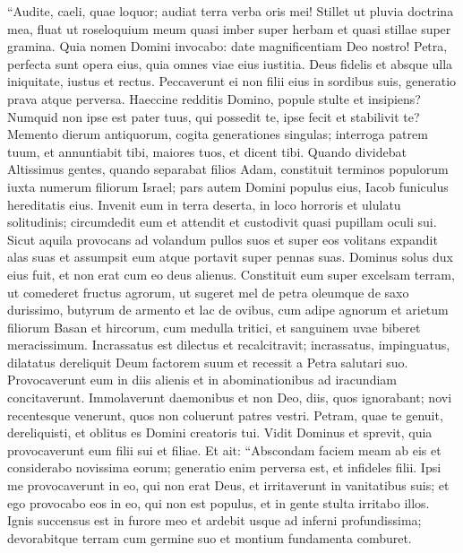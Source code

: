 \begin{biblechapter} 
\verse “Audite, caeli, quae loquor; audiat terra verba oris mei! 
\verse Stillet ut pluvia doctrina mea, fluat ut roseloquium meum quasi imber super herbam et quasi stillae super gramina. 
\verse Quia nomen Domini invocabo: date magnificentiam Deo nostro! 
\verse Petra, perfecta sunt opera eius, quia omnes viae eius iustitia. Deus fidelis et absque ulla iniquitate, iustus et rectus. 
\verse Peccaverunt ei non filii eius in sordibus suis, generatio prava atque perversa. 
\verse Haeccine redditis Domino, popule stulte et insipiens? Numquid non ipse est pater tuus, qui possedit te, ipse fecit et stabilivit te? 
\verse Memento dierum antiquorum, cogita generationes singulas; interroga patrem tuum, et annuntiabit tibi, maiores tuos, et dicent tibi. 
\verse Quando dividebat Altissimus gentes, quando separabat filios Adam, constituit terminos populorum iuxta numerum filiorum Israel; 
\verse pars autem Domini populus eius, Iacob funiculus hereditatis eius. 
\verse Invenit eum in terra deserta, in loco horroris et ululatu solitudinis; circumdedit eum et attendit et custodivit quasi pupillam oculi sui. 
\verse Sicut aquila provocans ad volandum pullos suos et super eos volitans expandit alas suas et assumpsit eum atque portavit super pennas suas. 
\verse Dominus solus dux eius fuit, et non erat cum eo deus alienus. 
\verse Constituit eum super excelsam terram, ut comederet fructus agrorum, ut sugeret mel de petra oleumque de saxo durissimo, 
\verse butyrum de armento et lac de ovibus, cum adipe agnorum et arietum filiorum Basan et hircorum, cum medulla tritici, et sanguinem uvae biberet meracissimum. 
\verse Incrassatus est dilectus et recalcitravit; incrassatus, impinguatus, dilatatus dereliquit Deum factorem suum et recessit a Petra salutari suo. 
\verse Provocaverunt eum in diis alienis et in abominationibus ad iracundiam concitaverunt. 
\verse Immolaverunt daemonibus et non Deo, diis, quos ignorabant; novi recentesque venerunt, quos non coluerunt patres vestri. 
\verse Petram, quae te genuit, dereliquisti, et oblitus es Domini creatoris tui. 
\verse Vidit Dominus et sprevit, quia provocaverunt eum filii sui et filiae. 
\verse Et ait: “Abscondam faciem meam ab eis et considerabo novissima eorum; generatio enim perversa est, et infideles filii. 
\verse Ipsi me provocaverunt in eo, qui non erat Deus, et irritaverunt in vanitatibus suis; et ego provocabo eos in eo, qui non est populus, et in gente stulta irritabo illos. 
\verse Ignis succensus est in furore meo et ardebit usque ad inferni profundissima; devorabitque terram cum germine suo et montium fundamenta comburet. 

\end{biblechapter}
